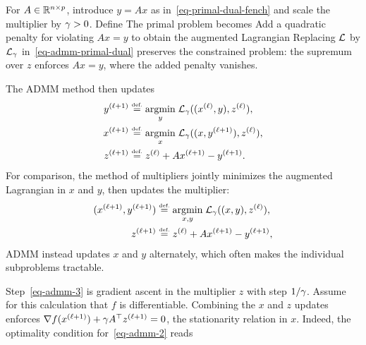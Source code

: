 For $A \in \mathbb{R}^{n \times p}$, introduce $y=Ax$ as in~\eqref{eq-primal-dual-fench} and scale the multiplier by $\gamma>0$. Define
The primal problem becomes
Add a quadratic penalty for violating $Ax=y$ to obtain the augmented Lagrangian
Replacing $\mathcal{L}$ by $\mathcal{L}_\gamma$ in~\eqref{eq-admm-primal-dual} preserves the constrained problem: the supremum over $z$ enforces $Ax=y$, where the added penalty vanishes.

The ADMM method then updates
\begin{align}
	\label{eq-admm-1}y^{(\ell+1)} &\stackrel{\mbox{\upshape\tiny def.}}{=} \underset{y}{\operatorname{argmin}}\; \mathcal{L}_\gamma( (x^{(\ell)},y),z^{(\ell)}  ), \\
	\label{eq-admm-2}x^{(\ell+1)} &\stackrel{\mbox{\upshape\tiny def.}}{=} \underset{x}{\operatorname{argmin}}\; \mathcal{L}_\gamma( (x,y^{(\ell+1)}),z^{(\ell)}  ), \\
	\label{eq-admm-3}z^{(\ell+1)} &\stackrel{\mbox{\upshape\tiny def.}}{=} z^{(\ell)} + A x^{(\ell+1)}-y^{(\ell+1)}. 
\end{align}
For comparison, the method of multipliers jointly minimizes the augmented Lagrangian in $x$ and $y$, then updates the multiplier:
\begin{align*}
	(x^{(\ell+1)},y^{(\ell+1)}) &\stackrel{\mbox{\upshape\tiny def.}}{=} \underset{x,y}{\operatorname{argmin}}\; \mathcal{L}_\gamma( (x,y),z^{(\ell)}  ), \\
	z^{(\ell+1)} &\stackrel{\mbox{\upshape\tiny def.}}{=} z^{(\ell)} + A x^{(\ell+1)}-y^{(\ell+1)}, 
\end{align*}
ADMM instead updates $x$ and $y$ alternately, which often makes the individual subproblems tractable.

Step~\eqref{eq-admm-3} is gradient ascent in the multiplier $z$ with step $1/\gamma$. Assume for this calculation that $f$ is differentiable. Combining the $x$ and $z$ updates enforces $\nabla f(x^{(\ell+1)})+\gamma A^\top z^{(\ell+1)}=0$, the stationarity relation in $x$. Indeed, the optimality condition for~\eqref{eq-admm-2} reads

